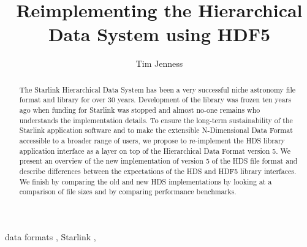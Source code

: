 \documentclass[final,authoryear,5p,times,twocolumn]{elsarticle}
\begin{document}
\begin{frontmatter}



\title{Reimplementing the Hierarchical Data System using HDF5}


\author[cornell]{Tim Jenness}


\address[cornell]{Department of Astronomy, Cornell University, Ithaca,
  NY 14853, USA}

\begin{abstract}
The Starlink Hierarchical Data System has been a very successful niche
astronomy file format and library for over 30 years. Development of the library
was frozen ten years ago when funding for Starlink was stopped and almost no-one
remains who understands the implementation details. To ensure the
long-term sustainability of the Starlink application software and to
make the extensible N-Dimensional Data Format accessible to a
broader range of users, we propose to re-implement the HDS library
application interface as a layer on top of the Hierarchical Data
Format version 5. We present an overview of the new implementation of
version 5 of the HDS file format and describe differences between the
expectations of the HDS and HDF5 library interfaces. We finish by
comparing the old and new HDS implementations by looking at a
comparison of file sizes and by comparing performance benchmarks.

\end{abstract}

\begin{keyword}


data formats \sep
Starlink \sep

\end{keyword}

\end{frontmatter}
\end{document}
